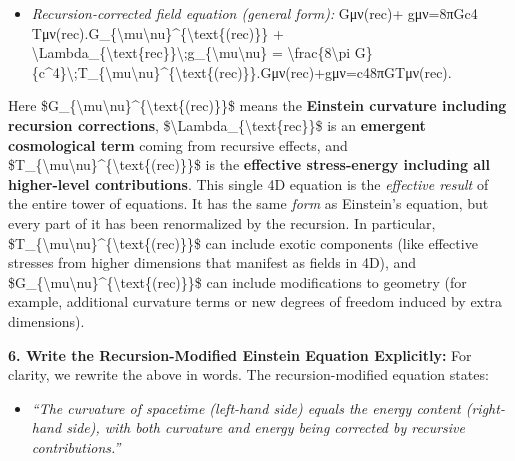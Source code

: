 \documentclass[
]{article}
\begin{document}
\begin{itemize}
\item
  \emph{Recursion-corrected field equation (general form):}
  Gμν(rec)+\Lambdarec  gμν=8πGc4  Tμν(rec).G\_\{\textbackslash mu\textbackslash nu\}\^{}\{\textbackslash text\{(rec)\}\}
  +
  \textbackslash Lambda\_\{\textbackslash text\{rec\}\}\textbackslash;g\_\{\textbackslash mu\textbackslash nu\}
  = \textbackslash frac\{8\textbackslash pi
  G\}\{c\^{}4\}\textbackslash;T\_\{\textbackslash mu\textbackslash nu\}\^{}\{\textbackslash text\{(rec)\}\}.Gμν(rec)\hspace{0pt}+\Lambdarec\hspace{0pt}gμν\hspace{0pt}=c48πG\hspace{0pt}Tμν(rec)\hspace{0pt}.
\end{itemize}

Here
\$G\_\{\textbackslash mu\textbackslash nu\}\^{}\{\textbackslash text\{(rec)\}\}\$
means the \textbf{Einstein curvature including recursion corrections},
\$\textbackslash Lambda\_\{\textbackslash text\{rec\}\}\$ is an
\textbf{emergent cosmological term} coming from recursive effects, and
\$T\_\{\textbackslash mu\textbackslash nu\}\^{}\{\textbackslash text\{(rec)\}\}\$
is the \textbf{effective stress-energy including all higher-level
contributions}\hspace{0pt}. This single 4D equation is the
\emph{effective result} of the entire tower of equations. It has the
same \emph{form} as Einstein's equation, but every part of it has been
renormalized by the recursion. In particular,
\$T\_\{\textbackslash mu\textbackslash nu\}\^{}\{\textbackslash text\{(rec)\}\}\$
can include exotic components (like effective stresses from higher
dimensions that manifest as fields in 4D), and
\$G\_\{\textbackslash mu\textbackslash nu\}\^{}\{\textbackslash text\{(rec)\}\}\$
can include modifications to geometry (for example, additional curvature
terms or new degrees of freedom induced by extra dimensions).

\textbf{6. Write the Recursion-Modified Einstein Equation Explicitly:}
For clarity, we rewrite the above in words. The recursion-modified
equation states\hspace{0pt}:

\begin{itemize}
\item
  \emph{``The curvature of spacetime (left-hand side) equals the energy
  content (right-hand side), with both curvature and energy being
  corrected by recursive contributions.''}
\end{itemize}
\end{document}
